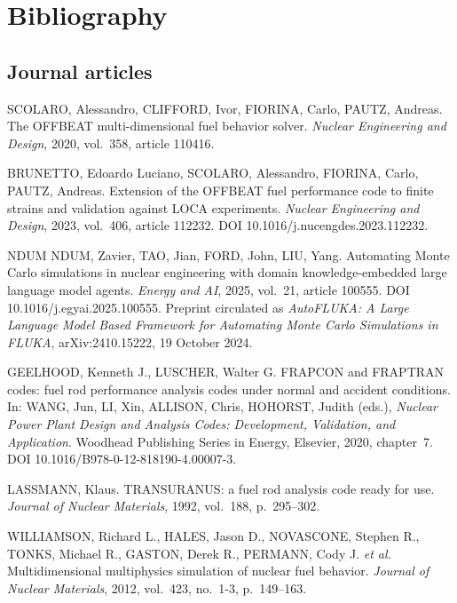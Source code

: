 \chapter*{Bibliography}

\vspace{0.6cm}

\section*{Journal articles}

\begin{list}{}{\setlength{\leftmargin}{1cm}\setlength{\itemindent}{-1cm}}

\item[{[1]}]
SCOLARO, Alessandro, CLIFFORD, Ivor, FIORINA, Carlo, PAUTZ, Andreas.
The OFFBEAT multi-dimensional fuel behavior solver.
\textit{Nuclear Engineering and Design}, 2020, vol.~358, article 110416.

\item[{[2]}]
BRUNETTO, Edoardo Luciano, SCOLARO, Alessandro, FIORINA, Carlo, PAUTZ, Andreas.
Extension of the OFFBEAT fuel performance code to finite strains and validation
against LOCA experiments.
\textit{Nuclear Engineering and Design}, 2023, vol.~406, article 112232.
DOI 10.1016/j.nucengdes.2023.112232.

\item[{[3]}]
NDUM NDUM, Zavier, TAO, Jian, FORD, John, LIU, Yang.
Automating Monte Carlo simulations in nuclear engineering with domain
knowledge-embedded large language model agents.
\textit{Energy and AI}, 2025, vol.~21, article 100555.
DOI 10.1016/j.egyai.2025.100555.
Preprint circulated as \textit{AutoFLUKA: A Large Language Model Based Framework
for Automating Monte Carlo Simulations in FLUKA}, arXiv:2410.15222,
19 October 2024.

\item[{[4]}]
GEELHOOD, Kenneth J., LUSCHER, Walter G.
FRAPCON and FRAPTRAN codes: fuel rod performance analysis codes under normal and
accident conditions. In: WANG, Jun, LI, Xin, ALLISON, Chris, HOHORST, Judith
(eds.), \textit{Nuclear Power Plant Design and Analysis Codes: Development,
Validation, and Application}. Woodhead Publishing Series in Energy, Elsevier,
2020, chapter~7. DOI 10.1016/B978-0-12-818190-4.00007-3.

\item[{[5]}]
LASSMANN, Klaus.
TRANSURANUS: a fuel rod analysis code ready for use.
\textit{Journal of Nuclear Materials}, 1992, vol.~188, p.~295--302.

\item[{[6]}]
WILLIAMSON, Richard L., HALES, Jason D., NOVASCONE, Stephen R.,
TONKS, Michael R., GASTON, Derek R., PERMANN, Cody J. \textit{et al.}
Multidimensional multiphysics simulation of nuclear fuel behavior.
\textit{Journal of Nuclear Materials}, 2012, vol.~423, no.~1-3, p.~149--163.

\end{list}

